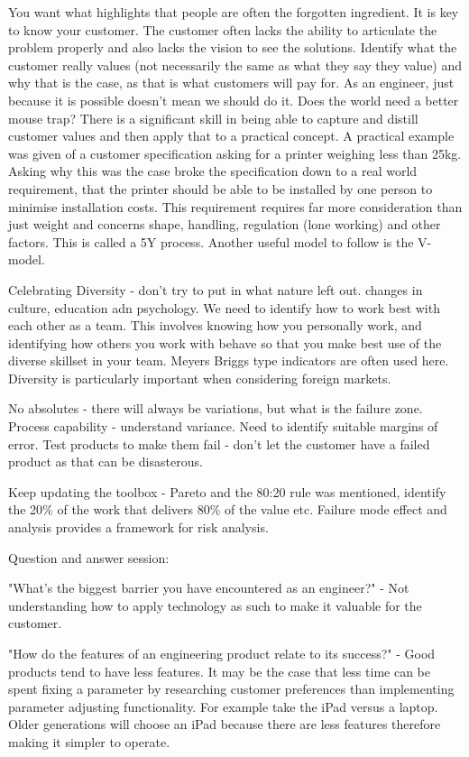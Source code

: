 \documentclass{elec6049Report}     %
\newcommand{\inote}[1] {\todo[inline]{#1}}
\begin{document}
You want what highlights that people are often the forgotten ingredient. It is key to know your customer. The customer often lacks the ability to articulate the problem properly and also lacks the vision to see the solutions. Identify what the customer really values (not necessarily the same as what they say they value) and why that is the case, as that is what customers will pay for. As an engineer, just because it is possible doesn't mean we should do it. Does the world need a better mouse trap? There is a significant skill in being able to capture and distill customer values and then apply that to a practical concept. A practical example was given of a customer specification asking for a printer weighing less than 25kg. Asking why this was the case broke the specification down to a real world requirement, that the printer should be able to be installed by one person to minimise installation costs. This requirement requires far more consideration than just weight and concerns shape, handling, regulation (lone working) and other factors. This is called a 5Y process. Another useful model to follow is the V-model.

Celebrating Diversity - don't try to put in what nature left out. changes in culture, education adn psychology. We need to identify how to work best with each other as a team. This involves knowing how you personally work, and identifying how others you work with behave so that you make best use of the diverse skillset in your team. Meyers Briggs type indicators are often used here. Diversity is particularly important when considering foreign markets. 

No absolutes - there will always be variations, but what is the failure zone. Process capability - understand variance. Need to identify suitable margins of error. Test products to make them fail - don't let the customer have a failed product as that can be disasterous. 

Keep updating the toolbox - Pareto and the 80:20 rule was mentioned, identify the 20\% of the work that delivers 80\% of the value etc. Failure mode effect and analysis provides a framework for risk analysis. 


Question and answer session:

"What's the biggest barrier you have encountered as an engineer?" - 
Not understanding how to apply technology as such to make it valuable for the customer. 

"How do the features of an engineering product relate to its success?" - 
Good products tend to have less features. 
It may be the case that less time can be spent fixing a parameter by researching customer preferences than implementing parameter adjusting functionality.
For example take the iPad versus a laptop.
Older generations will choose an iPad because there are less features therefore making it simpler to operate.
\end{document}
